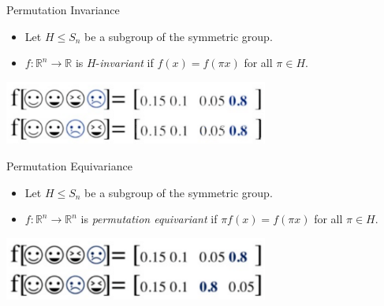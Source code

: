 \documentclass{beamer}
\begin{document}
\begin{frame}{Permutation Invariance}

    \begin{itemize}
        \setlength{\itemsep}{\fill}
        \item Let $H \leq S_n$ be a subgroup of the symmetric group.
        \item $f:\mathbb{R}^n \rightarrow \mathbb{R}$ is $H$-\textit{invariant} if $f(x) = f(\pi x)$ for all $\pi \in H$.
    \end{itemize}
    \begin{center}
        \includegraphics[width=0.65\textwidth]{../figures/perm_in.png}
    \end{center}
    
\end{frame}



\begin{frame}{Permutation Equivariance}

    \begin{itemize}
        \setlength{\itemsep}{\fill}
        \item Let $H \leq S_n$ be a subgroup of the symmetric group.
        \item $f:\mathbb{R}^n \rightarrow \mathbb{R}^n$ is \textit{permutation equivariant} if $\pi f(x) = f(\pi x)$ for all $\pi \in H$.
    \end{itemize}
    \begin{center}
        \includegraphics[width=0.65\textwidth]{../figures/perm_eq.png}
    \end{center}
    
\end{frame}
\end{document}
